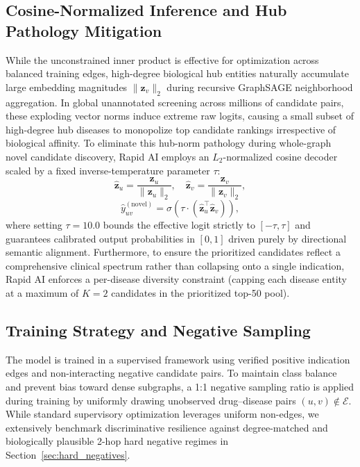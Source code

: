 \documentclass[conference,a4paper]{IEEEtran}
\begin{document}
\subsection{Cosine-Normalized Inference and Hub Pathology Mitigation}
While the unconstrained inner product is effective for optimization across balanced training edges, high-degree biological hub entities naturally accumulate large embedding magnitudes $\|\mathbf{z}_v\|_2$ during recursive GraphSAGE neighborhood aggregation. In global unannotated screening across millions of candidate pairs, these exploding vector norms induce extreme raw logits, causing a small subset of high-degree hub diseases to monopolize top candidate rankings irrespective of biological affinity. To eliminate this hub-norm pathology during whole-graph novel candidate discovery, Rapid AI employs an $L_2$-normalized cosine decoder scaled by a fixed inverse-temperature parameter $\tau$:
\begin{equation}
    \hat{\mathbf{z}}_u = \frac{\mathbf{z}_u}{\|\mathbf{z}_u\|_2}, \quad \hat{\mathbf{z}}_v = \frac{\mathbf{z}_v}{\|\mathbf{z}_v\|_2},
\end{equation}
\begin{equation}
    \hat{y}_{uv}^{(\mathrm{novel})} = \sigma \left( \tau \cdot \left( \hat{\mathbf{z}}_u^\top \hat{\mathbf{z}}_v \right) \right),
\end{equation}
where setting $\tau = 10.0$ bounds the effective logit strictly to $[-\tau, \tau]$ and guarantees calibrated output probabilities in $[0, 1]$ driven purely by directional semantic alignment. Furthermore, to ensure the prioritized candidates reflect a comprehensive clinical spectrum rather than collapsing onto a single indication, Rapid AI enforces a per-disease diversity constraint (capping each disease entity at a maximum of $K = 2$ candidates in the prioritized top-50 pool).

\subsection{Training Strategy and Negative Sampling}
The model is trained in a supervised framework using verified positive indication edges and non-interacting negative candidate pairs. To maintain class balance and prevent bias toward dense subgraphs, a 1:1 negative sampling ratio is applied during training by uniformly drawing unobserved drug--disease pairs $(u, v) \notin \mathcal{E}$. While standard supervisory optimization leverages uniform non-edges, we extensively benchmark discriminative resilience against degree-matched and biologically plausible 2-hop hard negative regimes in Section~\ref{sec:hard_negatives}.
\end{document}
